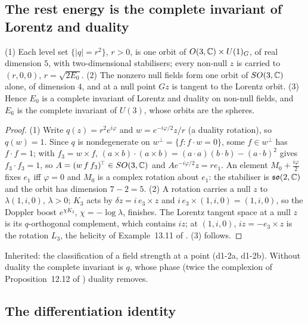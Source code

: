 \subsection{The rest energy is the complete invariant of Lorentz and duality}
\label{d1:sec:orbits}

\begin{theorem}[Orbits]
\label{d1:thm:orbits}
(1) Each level set $\{|q|=r^2\}$, $r>0$, is one orbit of $O(3,\mathbb{C})\times U(1)_G$, of real dimension $5$, with two-dimensional stabilisers; every
non-null $z$ is carried to $(r,0,0)$, $r=\sqrt{2E_0}$. (2) The nonzero null fields form one orbit of $SO(3,\mathbb{C})$ alone, of dimension $4$, and at a null
point $Gz$ is tangent to the Lorentz orbit. (3) Hence $E_0$ is a complete invariant of Lorentz and duality on non-null fields, and $E_6$ is the
complete invariant of $U(3)$, whose orbits are the spheres.
\end{theorem}

\begin{proof}
(1) Write $q(z)=r^2e^{i\varphi}$ and $w=e^{-i\varphi/2}z/r$ (a duality rotation), so $q(w)=1$. Since $q$ is nondegenerate on $w^\perp=\{f:f\cdot w=0\}$,
some $f\in w^\perp$ has $f\cdot f=1$; with $f_3=w\times f$, $(a\times b)\cdot(a\times b)=(a\cdot a)(b\cdot b)-(a\cdot b)^2$ gives $f_3\cdot f_3=1$, so
$A=(w\,f\,f_3)^{\!\top}\in SO(3,\mathbb{C})$ and $Ae^{-i\varphi/2}z=re_1$. An element $M_0+\tfrac{i\varphi}2$ fixes $e_1$ iff $\varphi=0$ and $M_0$ is a complex
rotation about $e_1$: the stabiliser is $\mathfrak{so}(2,\mathbb{C})$ and the orbit has dimension $7-2=5$. (2) A rotation carries a null $z$ to $\lambda(1,i,0)$, $\lambda>0$; $K_3$ acts by $\delta z=i\,e_3\times z$ and $i\,e_3\times(1,i,0)=(1,i,0)$, so the
Doppler boost $e^{\chi K_3}$, $\chi=-\log\lambda$, finishes. The Lorentz tangent space at a null $z$ is its $q$-orthogonal complement, which contains
$iz$; at $(1,i,0)$, $iz=-e_3\times z$ is the rotation $L_3$, the helicity of Example~13.11 of \cite{ES17}. (3) follows.
\end{proof}

Inherited: the classification of a field strength at a point \cite{Synge56,LandauLifshitz2} (d1-2a, d1-2b). Without duality the complete
invariant is $q$, whose phase (twice the complexion of Proposition~12.12 of \cite{ES17}) duality removes.

\subsection{The differentiation identity}
\label{d1:sec:identity}

